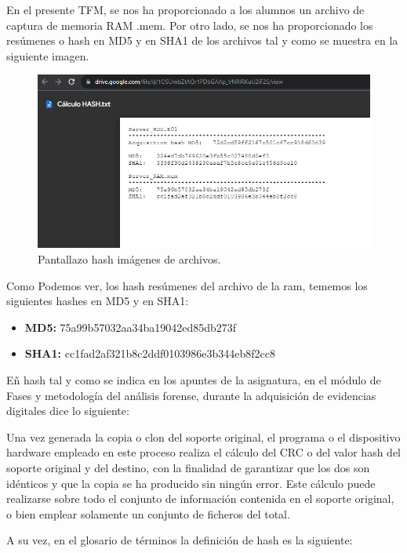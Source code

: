 En el presente TFM, se nos ha proporcionado a los alumnos un archivo de captura de memoria RAM .mem. Por otro lado, se nos ha proporcionado los resúmenes o hash en MD5 y en SHA1 de los archivos tal y como se muestra en la siguiente imagen.

\begin{figure}[htp]
    \centering
    \includegraphics[width=1.0\textwidth]{imagenes/007-imagen-hash-archivos.png}
    \caption{Pantallazo hash imágenes de archivos.}
    \label{Pantallazo hash imágenes de archivos.}
\end{figure}

Como Podemos ver, los hash resúmenes del archivo de la ram, tememos los siguientes hashes en MD5 y en SHA1:

\begin{itemize}
    \item \textbf{MD5:} 75a99b57032aa34ba19042ed85db273f
    \item \textbf{SHA1:} cc1fad2af321b8c2ddf0103986e3b344eb8f2cc8
\end{itemize}

Eñ hash tal y como se indica en los apuntes de la asignatura, en el módulo de Fases y metodología del análisis forense, durante la adquisición de evidencias digitales dice  lo siguiente:

Una vez generada la copia o clon del soporte original, el programa o el dispositivo hardware empleado en este proceso realiza el cálculo del CRC o del valor hash del soporte original y del destino, con la finalidad de garantizar que los dos son idénticos y que la copia se ha producido sin ningún error. Este cálculo puede realizarse sobre todo el conjunto de información contenida en el soporte original, o bien emplear solamente un conjunto de ficheros del total.

A su vez, en el glosario de términos la definición de hash es la siguiente:

